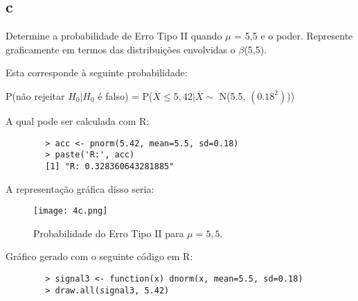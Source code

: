 \documentclass{article}[twocolumn]
\begin{document}
	\subsection{c}
	Determine a probabilidade de Erro Tipo II quando $\mu$ = 5,5 e o poder. Represente
	graficamente em termos das distribuições envolvidas o $\beta$(5,5).
	
	Esta corresponde \`a seguinte probabilidade:

	P(n\~ao rejeitar $H_0|H_0$ \'e falso) = P($\overline{X} \leq 5,42 |
	\overline{X} \sim$ N(5.5, $(0.18^2)$))

	A qual pode ser calculada com R:
	\begin{verbatim}
		> acc <- pnorm(5.42, mean=5.5, sd=0.18)
		> paste('R:', acc)
		[1] "R: 0.328360643281885"
	\end{verbatim}
	A representa\c{c}\~ao gr\'afica disso seria:
	\begin{figure}[H]
		\centering
		\texttt{[image: 4c.png]}
		\caption{Probabilidade do Erro Tipo II para $\mu = 5,5$.}
	\end{figure}
	Gr\'afico gerado com o seguinte c\'odigo em R:
	\begin{verbatim}
		> signal3 <- function(x) dnorm(x, mean=5.5, sd=0.18)
		> draw.all(signal3, 5.42)
	\end{verbatim}
\end{document}
